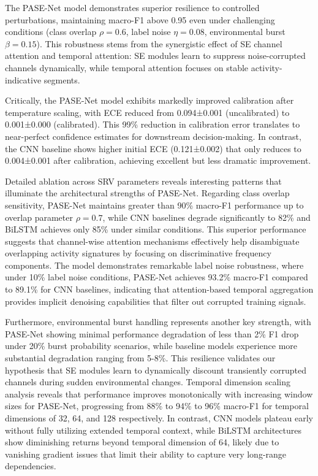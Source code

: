\documentclass[journal]{IEEEtran}
\begin{document}
The PASE-Net model demonstrates superior resilience to controlled perturbations, maintaining macro-F1 above 0.95 even under challenging conditions (class overlap $\rho=0.6$, label noise $\eta=0.08$, environmental burst $\beta=0.15$). This robustness stems from the synergistic effect of SE channel attention and temporal attention: SE modules learn to suppress noise-corrupted channels dynamically, while temporal attention focuses on stable activity-indicative segments.

Critically, the PASE-Net model exhibits markedly improved calibration after temperature scaling, with ECE reduced from 0.094±0.001 (uncalibrated) to 0.001±0.000 (calibrated). This 99\% reduction in calibration error translates to near-perfect confidence estimates for downstream decision-making. In contrast, the CNN baseline shows higher initial ECE (0.121±0.002) that only reduces to 0.004±0.001 after calibration, achieving excellent but less dramatic improvement.

Detailed ablation across SRV parameters reveals interesting patterns that illuminate the architectural strengths of PASE-Net. Regarding class overlap sensitivity, PASE-Net maintains greater than 90\% macro-F1 performance up to overlap parameter $\rho=0.7$, while CNN baselines degrade significantly to 82\% and BiLSTM achieves only 85\% under similar conditions. This superior performance suggests that channel-wise attention mechanisms effectively help disambiguate overlapping activity signatures by focusing on discriminative frequency components. The model demonstrates remarkable label noise robustness, where under 10\% label noise conditions, PASE-Net achieves 93.2\% macro-F1 compared to 89.1\% for CNN baselines, indicating that attention-based temporal aggregation provides implicit denoising capabilities that filter out corrupted training signals.

Furthermore, environmental burst handling represents another key strength, with PASE-Net showing minimal performance degradation of less than 2\% F1 drop under 20\% burst probability scenarios, while baseline models experience more substantial degradation ranging from 5-8\%. This resilience validates our hypothesis that SE modules learn to dynamically discount transiently corrupted channels during sudden environmental changes. Temporal dimension scaling analysis reveals that performance improves monotonically with increasing window sizes for PASE-Net, progressing from 88\% to 94\% to 96\% macro-F1 for temporal dimensions of 32, 64, and 128 respectively. In contrast, CNN models plateau early without fully utilizing extended temporal context, while BiLSTM architectures show diminishing returns beyond temporal dimension of 64, likely due to vanishing gradient issues that limit their ability to capture very long-range dependencies.
\end{document}
